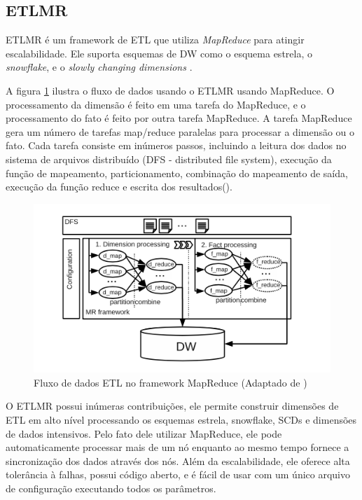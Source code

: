 \subsection{ETLMR}

ETLMR é um framework de ETL que utiliza \textit{MapReduce} para atingir escalabilidade. Ele suporta esquemas de DW como o esquema estrela, o \textit{snowflake}, e o \textit{slowly changing dimensions} \cite{liu:2011}. 

A figura \ref{etlmr} ilustra o fluxo de dados usando o ETLMR usando MapReduce. O processamento da dimensão é feito em uma tarefa do MapReduce, e o processamento do fato é feito por outra tarefa MapReduce. A tarefa MapReduce gera um número de tarefas map/reduce paralelas para processar a dimensão ou o fato. Cada tarefa consiste em inúmeros passos, incluindo a leitura dos dados no sistema de arquivos distribuído (DFS - distributed file system), execução da função de mapeamento, particionamento, combinação do mapeamento de saída, execução da função reduce e escrita dos resultados(\cite{liu:2011}).

\begin{figure}[h]
	\centering
	\includegraphics[scale=0.9]{fig/etlmr.png}
	\caption{Fluxo de dados ETL no framework MapReduce (Adaptado de \cite{liu:2011})}
	\label{etlmr}
\end{figure}

O ETLMR possui inúmeras contribuições, ele permite construir dimensões de ETL em alto nível processando os esquemas estrela, snowflake, SCDs e dimensões de dados intensivos. Pelo fato dele utilizar MapReduce, ele pode automaticamente processar mais de um nó enquanto ao mesmo tempo fornece a sincronização dos dados através dos nós. Além da escalabilidade, ele oferece alta tolerância à falhas, possui código aberto, e é fácil de usar com um único arquivo de configuração executando todos os parâmetros.

